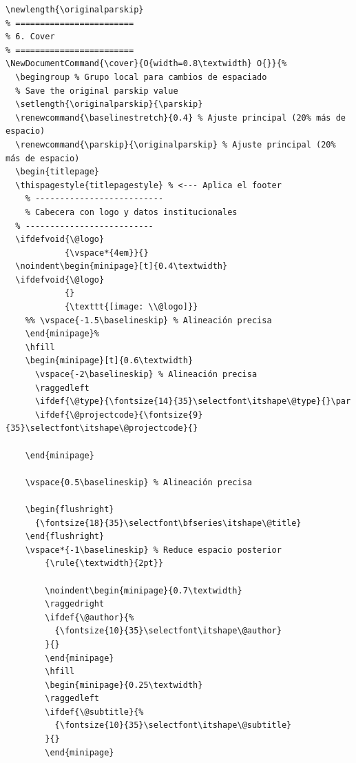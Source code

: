 \documentclass{reporti}
\begin{document}
\begin{verbatim}
\newlength{\originalparskip}
% ========================
% 6. Cover
% ========================
\NewDocumentCommand{\cover}{O{width=0.8\textwidth} O{}}{%
  \begingroup % Grupo local para cambios de espaciado
  % Save the original parskip value
  \setlength{\originalparskip}{\parskip}
  \renewcommand{\baselinestretch}{0.4} % Ajuste principal (20% más de espacio)
  \renewcommand{\parskip}{\originalparskip} % Ajuste principal (20% más de espacio)
  \begin{titlepage}
  \thispagestyle{titlepagestyle} % <--- Aplica el footer
    % --------------------------
    % Cabecera con logo y datos institucionales
  % --------------------------
  \ifdefvoid{\@logo}
            {\vspace*{4em}}{}
  \noindent\begin{minipage}[t]{0.4\textwidth}
  \ifdefvoid{\@logo}
            {}
            {\texttt{[image: \\@logo]}}
    %% \vspace{-1.5\baselineskip} % Alineación precisa
    \end{minipage}%
    \hfill
    \begin{minipage}[t]{0.6\textwidth}
      \vspace{-2\baselineskip} % Alineación precisa
      \raggedleft
      \ifdef{\@type}{\fontsize{14}{35}\selectfont\itshape\@type}{}\par
      \ifdef{\@projectcode}{\fontsize{9}{35}\selectfont\itshape\@projectcode}{}

    \end{minipage}
    
    \vspace{0.5\baselineskip} % Alineación precisa

    \begin{flushright}
      {\fontsize{18}{35}\selectfont\bfseries\itshape\@title}
    \end{flushright}
    \vspace*{-1\baselineskip} % Reduce espacio posterior
        {\rule{\textwidth}{2pt}}

        \noindent\begin{minipage}{0.7\textwidth}
        \raggedright
        \ifdef{\@author}{%
          {\fontsize{10}{35}\selectfont\itshape\@author}
        }{}
        \end{minipage}
        \hfill
        \begin{minipage}{0.25\textwidth}
        \raggedleft
        \ifdef{\@subtitle}{%
          {\fontsize{10}{35}\selectfont\itshape\@subtitle}
        }{}
        \end{minipage}


\end{verbatim}
\end{document}
